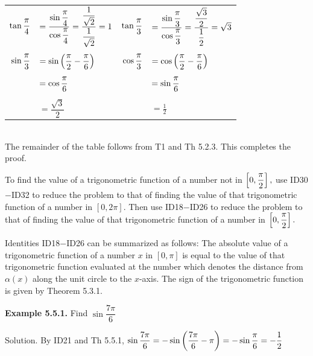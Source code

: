 \begin{tabular}{r l r l}
$\tan \dfrac{\pi}{4}$&$= \dfrac{\sin \dfrac{\pi}{4}}{\cos \dfrac{\pi}{4} } = \dfrac{\dfrac{1}{\sqrt{2}}}{\dfrac{1}{\sqrt{2}}} = 1$&$\tan \dfrac{\pi}{3}$&$= \dfrac{\sin \dfrac{\pi}{3}}{\cos \dfrac{\pi}{3} } = \dfrac{\dfrac{\sqrt{3}}{2}}{\dfrac{1}{2}} = \sqrt{3}$\\
&&&\\
$\sin \dfrac{\pi}{3}$&$= \sin\left(\dfrac{\pi}{2} - \dfrac{\pi}{6}\right)$&$\cos \dfrac{\pi}{3}$&$=\cos\left(\dfrac{\pi}{2} - \dfrac{\pi}{6}\right)$\\
&&&\\
&$= \cos \dfrac{\pi}{6}$&&$= \sin \dfrac{\pi}{6}$\\
&&&\\
&$= \dfrac{\sqrt{3}}{2}$&&$= \frac{1}{2}$\\

\end{tabular}\\
The remainder of the table follows from T1 and Th 5.2.3. This completes the proof. \nl


To find the value of a trigonometric function of a number not in $\left[0, \dfrac{\pi}{2}\right],$ use ID30$-$ID32 to reduce the problem to that of finding the value of that trigonometric function of a number in  $\left[0, 2\pi \right].$  Then use ID18$-$ID26 to reduce the problem to that of finding the value of that trigonometric function of a number in $\left[0, \dfrac{\pi}{2} \right].$\nl

Identities ID18$-$ID26 can be summarized as follows:  The absolute value of a trigonometric function of a number $x$ in $[0, \pi]$ is equal to the value of that trigonometric function evaluated at the number which denotes the distance from  $\alpha (x)$ along the unit circle to the $x$-axis.  The sign of the trigonometric function is given by Theorem 5.3.1.

\textbf{Example 5.5.1.} Find $\sin \dfrac{7\pi}{6}$\nl

Solution. By ID21 and Th 5.5.1, $\sin \dfrac{7\pi}{6} = -\sin\left(\dfrac{7\pi}{6}  -\pi\right)= -\sin\dfrac{\pi}{6} = -\dfrac{1}{2}$\nl

